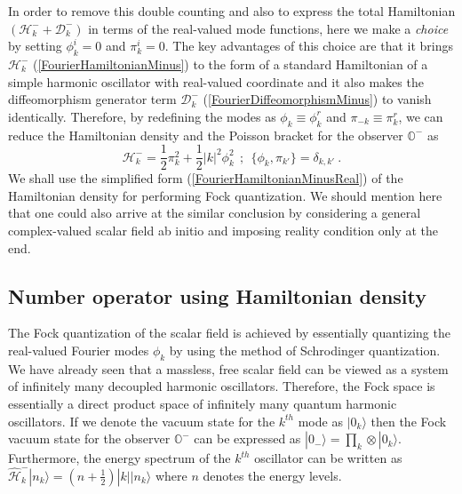 \documentclass[aps,twocolumn,showpacs]{revtex4}
\def\observerminus{\mathbb{O}^{-}}
\begin{document}
In order to remove this double counting and also to express the total 
Hamiltonian $(\mathcal{H}_k^{-} + \mathcal{D}_k^{-})$  in terms of the 
real-valued mode functions, here we make a \emph{choice} by setting $\phi_{k}^i 
= 0$ and $\pi_{k}^i = 0$. The key advantages of this choice are that it 
brings $\mathcal{H}_k^{-}$ (\ref{FourierHamiltonianMinus}) to the form of a 
standard Hamiltonian of a simple harmonic oscillator with real-valued 
coordinate and it also makes the diffeomorphism generator term 
$\mathcal{D}_k^{-}$ (\ref{FourierDiffeomorphismMinus}) to vanish identically. 
Therefore, by redefining the modes as $\phi_{k} \equiv \phi_{k}^r$ and  
$\pi_{-k} \equiv \pi_{k}^r$, we can reduce the Hamiltonian density and
the Poisson bracket for the observer $\observerminus$ as 
%
\begin{equation}\label{FourierHamiltonianMinusReal}
\mathcal{H}_k^{-} = \frac{1}{2} \pi_{k}^2 + \frac{1}{2} |k|^2\phi_{k}^2
~~;~~  \{\phi_{k}, \pi_{k'}\} = \delta_{k,k'} ~.
\end{equation}
%
We shall use the simplified form (\ref{FourierHamiltonianMinusReal}) 
of the Hamiltonian density for performing Fock quantization. We should mention 
here that one could also arrive at the similar conclusion by considering a 
general complex-valued scalar field ab initio \cite{book:ADas,book:Peskin}
and imposing reality condition only at the end.





\subsection{Number operator using Hamiltonian density}


The Fock quantization of the scalar field is achieved by essentially quantizing 
the real-valued Fourier modes $\phi_{k}$ by using the method of Schrodinger 
quantization. We have already seen that a massless, free scalar field can be 
viewed as a system of infinitely many decoupled harmonic oscillators. Therefore, 
the Fock space is essentially a direct product space of infinitely many quantum 
harmonic oscillators. If we denote the vacuum state for the $k^{th}$ mode as 
$|0_k\rangle$ then the Fock vacuum state for the observer $\observerminus$ can 
be expressed as $|0_{-}\rangle = \prod_{k} \otimes |0_k\rangle$. Furthermore, 
the energy spectrum of the $k^{th}$ oscillator can be written as 
$\hat{\mathcal{H}}_{k}^{-} |n_k\rangle = (n+\frac{1}{2})|k| |n_k\rangle$ where 
$n$ denotes the energy levels.
\end{document}
